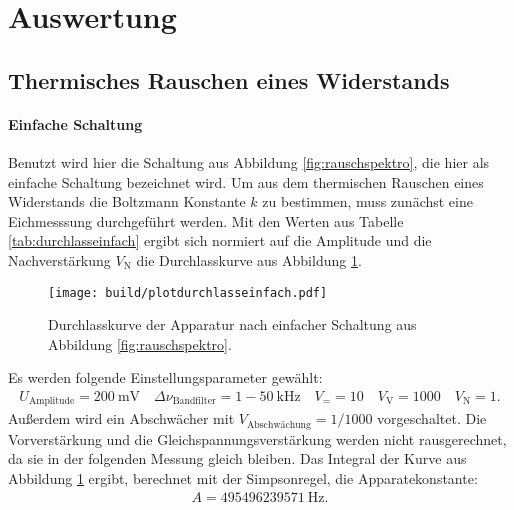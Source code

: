 \section{Auswertung}
\label{sec:Auswertung}

\subsection{Thermisches Rauschen eines Widerstands}

\paragraph{Einfache Schaltung}

Benutzt wird hier die Schaltung aus Abbildung \ref{fig:rauschspektro}, die hier als einfache Schaltung bezeichnet wird. Um aus dem thermischen Rauschen eines Widerstands die Boltzmann Konstante $k$ zu bestimmen, muss zunächst eine Eichmesssung durchgeführt werden. Mit den Werten aus Tabelle \ref{tab:durchlasseinfach} ergibt sich normiert auf die Amplitude und die Nachverstärkung $V_\text{N}$ die Durchlasskurve aus Abbildung \ref{fig:plotdurchlasseinfach}.
\begin{figure}
  \centering
  \texttt{[image: build/plotdurchlasseinfach.pdf]}
  \caption{Durchlasskurve der Apparatur nach einfacher Schaltung aus Abbildung \ref{fig:rauschspektro}.}
  \label{fig:plotdurchlasseinfach}
\end{figure}
Es werden folgende Einstellungsparameter gewählt:
\begin{align*}
  U_\text{Amplitude} = \SI{200}{\milli\volt} \quad \Delta \nu_\text{Bandfilter} = \num{1}-\SI{50}{\kilo\hertz}\quad V_= = 10 \quad V_\text{V} = 1000 \quad V_\text{N} = 1.
\end{align*}
Außerdem wird ein Abschwächer mit $V_\text{Abschwächung} = 1/1000$ vorgeschaltet. Die Vorverstärkung und die Gleichspannungsverstärkung werden nicht rausgerechnet, da sie in der folgenden Messung gleich bleiben. Das Integral der Kurve aus Abbildung \ref{fig:plotdurchlasseinfach} ergibt, berechnet mit der Simpsonregel, die Apparatekonstante:
\begin{align}
  A = \SI{495496239571}{\hertz}.
\end{align}

